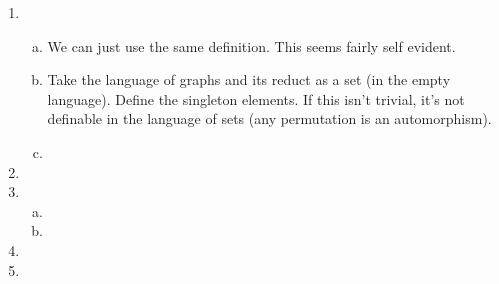 \documentclass[10pt]{article}
\begin{document}
\begin{enumerate}[1.]
%	
%	
%	
\item 
	\begin{enumerate}[a)]
	\item We can just use the same definition. This seems fairly self evident. 
	
	\item Take the language of graphs and its reduct as a set (in the empty language). Define the singleton elements. If this isn't trivial, it's not definable in the language of sets (any permutation is an automorphism). 
	
	\item %
	
	\end{enumerate}

\item %
\item 
	\begin{enumerate}[a)]
	\item
	
	\item
	
	\end{enumerate}
\item 
\item 

\end{enumerate}
\end{document}
